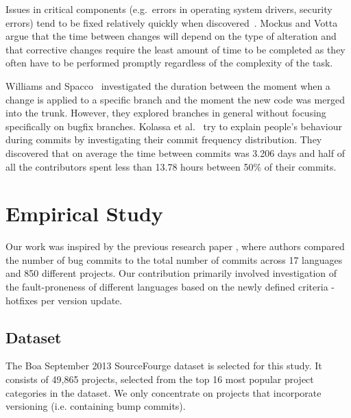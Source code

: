 \documentclass{sig-alternate}
\begin{document}
Issues in critical components (e.g.~errors in operating system drivers, security errors) tend to be fixed relatively quickly when discovered~\cite{Livshits2005}. Mockus and Votta~\cite{Mockus2000} argue that the time between changes will depend on the type of alteration and that corrective changes require the least amount of time to be completed as they often have to be performed promptly regardless of the complexity of the task.

Williams and Spacco~\cite{Williams2008} investigated the duration between the moment when a change is applied to a specific branch and the moment the new code was merged into the trunk. However, they explored branches in general without focusing specifically on bugfix branches. Kolassa et al.~\cite{Kolassa2013} try to explain people's behaviour during commits by investigating their commit frequency distribution. They discovered that on average the time between commits was 3.206 days and half of all the contributors spent less than 13.78 hours between 50\% of their commits.



\section{Empirical Study}


Our work was inspired by the previous research paper \cite{Ray2014}, where authors compared the number of bug commits to the total number of commits across 17 languages and 850 different projects. Our contribution primarily involved investigation of the fault-proneness of different languages based on the newly defined criteria - hotfixes per version update. 

\subsection{Dataset}
The Boa September 2013 SourceFourge dataset is selected for this study. It consists of 49,865 projects, selected from the top 16 most popular project categories in the dataset. We only concentrate on projects that incorporate versioning (i.e. containing bump commits). %
\end{document}
